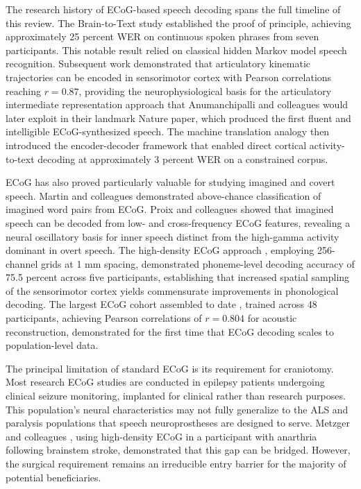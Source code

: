The research history of ECoG-based speech decoding spans the full timeline of this review. The Brain-to-Text study \cite{Herff2015} established the proof of principle, achieving approximately 25 percent WER on continuous spoken phrases from seven participants. This notable result relied on classical hidden Markov model speech recognition. Subsequent work \cite{Chartier2018} demonstrated that articulatory kinematic trajectories can be encoded in sensorimotor cortex with Pearson correlations reaching $r=0.87$, providing the neurophysiological basis for the articulatory intermediate representation approach that Anumanchipalli and colleagues \cite{Anumanchipalli2019} would later exploit in their landmark Nature paper, which produced the first fluent and intelligible ECoG-synthesized speech. The machine translation analogy \cite{Makin2020} then introduced the encoder-decoder framework that enabled direct cortical activity-to-text decoding at approximately 3 percent WER on a constrained corpus.

ECoG has also proved particularly valuable for studying imagined and covert speech. Martin and colleagues \cite{Martin2016} demonstrated above-chance classification of imagined word pairs from ECoG. Proix and colleagues \cite{Proix2022} showed that imagined speech can be decoded from low- and cross-frequency ECoG features, revealing a neural oscillatory basis for inner speech distinct from the high-gamma activity dominant in overt speech. The high-density ECoG approach \cite{Ramsey2018}, employing 256-channel grids at 1 mm spacing, demonstrated phoneme-level decoding accuracy of 75.5 percent across five participants, establishing that increased spatial sampling of the sensorimotor cortex yields commensurate improvements in phonological decoding. The largest ECoG cohort assembled to date \cite{Chen2024Neural}, trained across 48 participants, achieving Pearson correlations of $r=0.804$ for acoustic reconstruction, demonstrated for the first time that ECoG decoding scales to population-level data.

The principal limitation of standard ECoG is its requirement for craniotomy. Most research ECoG studies are conducted in epilepsy patients undergoing clinical seizure monitoring, implanted for clinical rather than research purposes. This population's neural characteristics may not fully generalize to the ALS and paralysis populations that speech neuroprostheses are designed to serve. Metzger and colleagues \cite{Metzger2023}, using high-density ECoG in a participant with anarthria following brainstem stroke, demonstrated that this gap can be bridged. However, the surgical requirement remains an irreducible entry barrier for the majority of potential beneficiaries.


